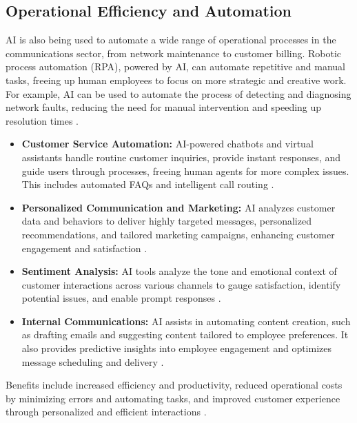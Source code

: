 \subsection{Operational Efficiency and Automation}
AI is also being used to automate a wide range of operational processes in the communications sector, from network maintenance to customer billing. Robotic process automation (RPA), powered by AI, can automate repetitive and manual tasks, freeing up human employees to focus on more strategic and creative work. For example, AI can be used to automate the process of detecting and diagnosing network faults, reducing the need for manual intervention and speeding up resolution times \cite{kumar2012role}.
\begin{itemize}
    \item \textbf{Customer Service Automation:} AI-powered chatbots and virtual assistants handle routine customer inquiries, provide instant responses, and guide users through processes, freeing human agents for more complex issues. This includes automated FAQs and intelligent call routing \cite{NewHorizons_CustomerExp, Acrobits_CustomerExp}.
    \item \textbf{Personalized Communication and Marketing:} AI analyzes customer data and behaviors to deliver highly targeted messages, personalized recommendations, and tailored marketing campaigns, enhancing customer engagement and satisfaction \cite{Zendesk_CustomerExp, Net2Phone_CustomerExp}.
    \item \textbf{Sentiment Analysis:} AI tools analyze the tone and emotional context of customer interactions across various channels to gauge satisfaction, identify potential issues, and enable prompt responses \cite{Elfsight_CustomerExp, ControlHippo_CustomerExp}.
    \item \textbf{Internal Communications:} AI assists in automating content creation, such as drafting emails and suggesting content tailored to employee preferences. It also provides predictive insights into employee engagement and optimizes message scheduling and delivery \cite{Sprinklr_InternalComms, Microsoft_InternalComms}.
\end{itemize}
Benefits include increased efficiency and productivity, reduced operational costs by minimizing errors and automating tasks, and improved customer experience through personalized and efficient interactions \cite{UST_OperationalEff, AL_Enterprise_OperationalEff}.

